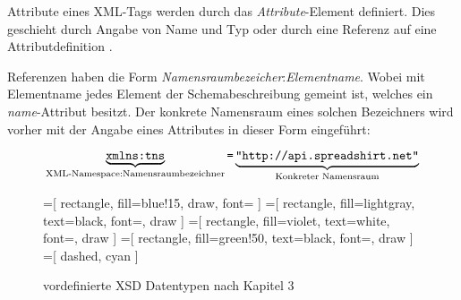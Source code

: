 Attribute eines XML-Tags werden durch das \emph{Attribute}-Element definiert. Dies geschieht durch Angabe von Name und Typ  oder durch eine Referenz auf eine Attributdefinition .

Referenzen haben die Form \emph{Namensraumbezeicher}:\emph{Elementname}. Wobei mit Elementname jedes Element der Schemabeschreibung gemeint ist, welches ein \emph{name}-Attribut besitzt. Der konkrete Namensraum eines solchen Bezeichners wird vorher mit der Angabe eines Attributes in dieser Form eingeführt:

\[  
    \underbrace{\texttt{xmlns:tns}}_{\tiny \text{XML-Namespace:Namensraumbezeichner}}\texttt{=}\underbrace{\texttt{"http://api.spreadshirt.net"}}_{\tiny \text{Konkreter Namensraum}}
\]

%
%

\begin{sidewaysfigure}
    \centering
    =[
        rectangle,
        fill={blue!15},
        draw,
        font=\sffamily
    ]      
    =[
        rectangle,
        fill=lightgray,
        text=black,
        font=\sffamily,
        draw
    ]
    =[
        rectangle,
        fill=violet,
        text=white,
        font=\sffamily,
        draw
    ]
    =[
        rectangle,
        fill=green!50,
        text=black,
        font=\sffamily,
        draw
    ]
    =[
        dashed,
        cyan
    ]
    \resizebox{\textheight}{!}{
            
    }
    \vspace{\baselineskip}\\
    \resizebox{0.5\textheight}{!}{
            
    }        
    \caption{vordefinierte XSD Datentypen nach \cite{XMLSchema11Specification} Kapitel 3}
    \label{fig:xsddatatypes}
\end{sidewaysfigure}